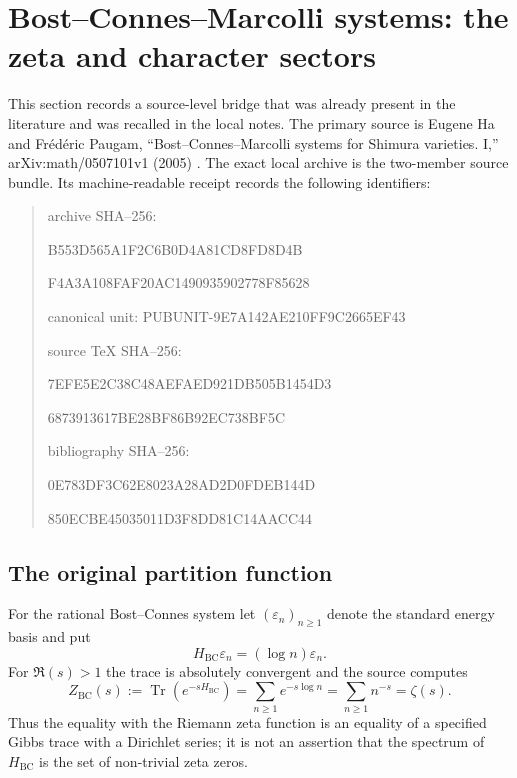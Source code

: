 \section{Bost--Connes--Marcolli systems: the zeta and character sectors}
\label{sec:bcm-ha-paugam-crosswalk}

This section records a source-level bridge that was already present in the
literature and was recalled in the local notes.  The primary source is Eugene
Ha and Fr\'ed\'eric Paugam, ``Bost--Connes--Marcolli systems for Shimura
varieties. I,'' arXiv:math/0507101v1 (2005) \cite{haPaugam2005}.  The exact
local archive is the two-member source bundle.  Its machine-readable receipt
records the following identifiers:
\begin{quote}\small\ttfamily
archive SHA--256:\par
B553D565A1F2C6B0D4A81CD8FD8D4B\par
F4A3A108FAF20AC1490935902778F85628\par
canonical unit: PUBUNIT-9E7A142AE210FF9C2665EF43\par
source TeX SHA--256:\par
7EFE5E2C38C48AEFAED921DB505B1454D3\par
6873913617BE28BF86B92EC738BF5C\par
bibliography SHA--256:\par
0E783DF3C62E8023A28AD2D0FDEB144D\par
850ECBE45035011D3F8DD81C14AACC44
\end{quote}

\subsection{The original partition function}

For the rational Bost--Connes system let $(\varepsilon_n)_{n\geq 1}$ denote
the standard energy basis and put
\begin{equation}
 H_{\mathrm{BC}}\varepsilon_n=(\log n)\varepsilon_n.
 \label{eq:bcm-rational-hamiltonian}
\end{equation}
For $\Re(s)>1$ the trace is absolutely convergent and the source computes
\begin{equation}
 Z_{\mathrm{BC}}(s)
 :=\operatorname{Tr}(e^{-sH_{\mathrm{BC}}})
 =\sum_{n\geq1}e^{-s\log n}
 =\sum_{n\geq1}n^{-s}
 =\zeta(s).
 \label{eq:bcm-rational-zeta}
\end{equation}
Thus the equality with the Riemann zeta function is an equality of a specified
Gibbs trace with a Dirichlet series; it is not an assertion that the spectrum
of $H_{\mathrm{BC}}$ is the set of non-trivial zeta zeros.

